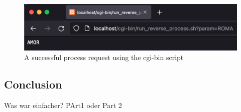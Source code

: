 \begin{figure}[h]
\centering
\includegraphics[scale=0.6]{images/part2Success}
\caption{A successful process request using the cgi-bin script}
\label{fig:01_part2_impl_success}
\end{figure}

\subsection{Conclusion}\label{subsec:02_part2_concl}
Was war einfacher? PArt1 oder Part 2